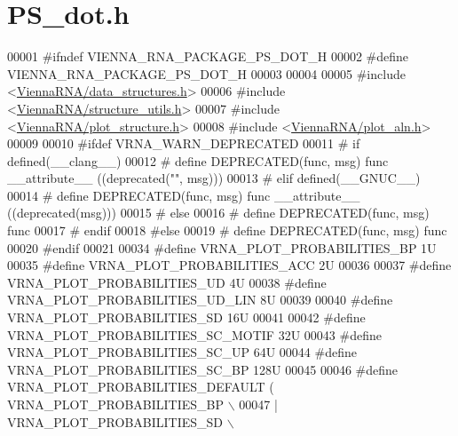 \hypertarget{PS__dot_8h_source}{}\section{P\+S\+\_\+dot.\+h}
\label{PS__dot_8h_source}

\begin{DoxyCode}
00001 \textcolor{preprocessor}{#ifndef VIENNA\_RNA\_PACKAGE\_PS\_DOT\_H}
00002 \textcolor{preprocessor}{#define VIENNA\_RNA\_PACKAGE\_PS\_DOT\_H}
00003 
00004 
00005 \textcolor{preprocessor}{#include <\hyperlink{data__structures_8h}{ViennaRNA/data\_structures.h}>}
00006 \textcolor{preprocessor}{#include <\hyperlink{structure__utils_8h}{ViennaRNA/structure\_utils.h}>}
00007 \textcolor{preprocessor}{#include <\hyperlink{plot__structure_8h}{ViennaRNA/plot\_structure.h}>}
00008 \textcolor{preprocessor}{#include <\hyperlink{plot__aln_8h}{ViennaRNA/plot\_aln.h}>}
00009 
00010 \textcolor{preprocessor}{#ifdef VRNA\_WARN\_DEPRECATED}
00011 \textcolor{preprocessor}{# if defined(\_\_clang\_\_)}
00012 \textcolor{preprocessor}{#  define DEPRECATED(func, msg) func \_\_attribute\_\_ ((deprecated("", msg)))}
00013 \textcolor{preprocessor}{# elif defined(\_\_GNUC\_\_)}
00014 \textcolor{preprocessor}{#  define DEPRECATED(func, msg) func \_\_attribute\_\_ ((deprecated(msg)))}
00015 \textcolor{preprocessor}{# else}
00016 \textcolor{preprocessor}{#  define DEPRECATED(func, msg) func}
00017 \textcolor{preprocessor}{# endif}
00018 \textcolor{preprocessor}{#else}
00019 \textcolor{preprocessor}{# define DEPRECATED(func, msg) func}
00020 \textcolor{preprocessor}{#endif}
00021 
00034 \textcolor{preprocessor}{#define VRNA\_PLOT\_PROBABILITIES\_BP        1U}
00035 \textcolor{preprocessor}{#define VRNA\_PLOT\_PROBABILITIES\_ACC       2U}
00036 
00037 \textcolor{preprocessor}{#define VRNA\_PLOT\_PROBABILITIES\_UD        4U}
00038 \textcolor{preprocessor}{#define VRNA\_PLOT\_PROBABILITIES\_UD\_LIN    8U}
00039 
00040 \textcolor{preprocessor}{#define VRNA\_PLOT\_PROBABILITIES\_SD        16U}
00041 
00042 \textcolor{preprocessor}{#define VRNA\_PLOT\_PROBABILITIES\_SC\_MOTIF  32U}
00043 \textcolor{preprocessor}{#define VRNA\_PLOT\_PROBABILITIES\_SC\_UP     64U}
00044 \textcolor{preprocessor}{#define VRNA\_PLOT\_PROBABILITIES\_SC\_BP     128U}
00045 
00046 \textcolor{preprocessor}{#define VRNA\_PLOT\_PROBABILITIES\_DEFAULT   (   VRNA\_PLOT\_PROBABILITIES\_BP \(\backslash\)}
00047 \textcolor{preprocessor}{                                            | VRNA\_PLOT\_PROBABILITIES\_SD \(\backslash\)}

\end{DoxyCode}
